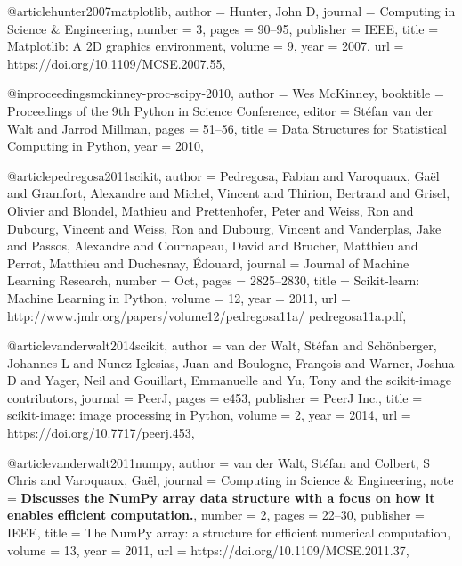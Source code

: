 @article{hunter2007matplotlib,
  author =        {Hunter, John D},
  journal =       {Computing in Science \& Engineering},
  number =        {3},
  pages =         {90--95},
  publisher =     {IEEE},
  title =         {Matplotlib: A {2D} graphics environment},
  volume =        {9},
  year =          {2007},
  url =           {https://doi.org/10.1109/MCSE.2007.55},
}

@inproceedings{mckinney-proc-scipy-2010,
  author =        {Wes McKinney},
  booktitle =     {Proceedings of the 9th Python in Science Conference},
  editor =        {St\'efan van der Walt and Jarrod Millman},
  pages =         {51--56},
  title =         {Data Structures for Statistical Computing in
                   {Python}},
  year =          {2010},
}

@article{pedregosa2011scikit,
  author =        {Pedregosa, Fabian and Varoquaux, Ga{\"e}l and
                   Gramfort, Alexandre and Michel, Vincent and
                   Thirion, Bertrand and Grisel, Olivier and
                   Blondel, Mathieu and Prettenhofer, Peter and
                   Weiss, Ron and Dubourg, Vincent and Weiss, Ron and
                   Dubourg, Vincent and Vanderplas, Jake and
                   Passos, Alexandre and Cournapeau, David and
                   Brucher, Matthieu and Perrot, Matthieu and
                   Duchesnay, {\'E}douard},
  journal =       {Journal of Machine Learning Research},
  number =        {Oct},
  pages =         {2825--2830},
  title =         {Scikit-learn: Machine Learning in {P}ython},
  volume =        {12},
  year =          {2011},
  url =           {http://www.jmlr.org/papers/volume12/pedregosa11a/
                   pedregosa11a.pdf},
}

@article{vanderwalt2014scikit,
  author =        {van der Walt, St{\'e}fan and
                   Sch{\"o}nberger, Johannes L and Nunez-Iglesias, Juan and
                   Boulogne, Fran{\c{c}}ois and Warner, Joshua D and
                   Yager, Neil and Gouillart, Emmanuelle and Yu, Tony and
                   {the scikit-image contributors}},
  journal =       {PeerJ},
  pages =         {e453},
  publisher =     {PeerJ Inc.},
  title =         {{scikit-image}: image processing in {P}ython},
  volume =        {2},
  year =          {2014},
  url =           {https://doi.org/10.7717/peerj.453},
}

@article{vanderwalt2011numpy,
  author =        {van der Walt, St{\'e}fan and Colbert, S Chris and
                   Varoquaux, Ga{\"e}l},
  journal =       {Computing in Science \& Engineering},
  note =          {\newline \textbf{Discusses the NumPy array data
                   structure with a focus on how it enables efficient
                   computation.}},
  number =        {2},
  pages =         {22--30},
  publisher =     {IEEE},
  title =         {The {NumPy} array: a structure for efficient
                   numerical computation},
  volume =        {13},
  year =          {2011},
  url =           {https://doi.org/10.1109/MCSE.2011.37},
}

